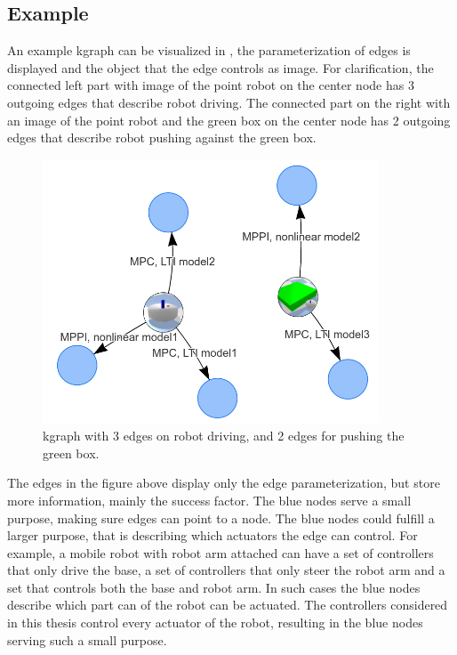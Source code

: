 \subsection{Example}%
\label{subsec:kgraph_example}
An example \ac{kgraph} can be visualized in , the parameterization of edges is displayed and the object that the edge controls as image. For clarification, the connected left part with image of the point robot on the center node has 3 outgoing edges that describe robot driving. The connected part on the right with an image of the point robot and the green box on the center node has 2 outgoing edges that describe robot pushing against the green box.\bs

\begin{figure}[H]
    \centering
    \includegraphics[width=10cm]{figures/kgraph_example}
    \caption{\ac{kgraph} with 3 edges on robot driving, and 2 edges for pushing the green box.}%
    \label{fig:kgraph_example}
\end{figure}

The edges in the figure above display only the edge parameterization, but store more information, mainly the success factor. The blue nodes serve a small purpose, making sure edges can point to a node. The blue nodes could fulfill a larger purpose, that is describing which actuators the edge can control. For example, a mobile robot with robot arm attached can have a set of controllers that only drive the base, a set of controllers that only steer the robot arm and a set that controls both the base and robot arm. In such cases the blue nodes describe which part can of the robot can be actuated. The controllers considered in this thesis control every actuator of the robot, resulting in the blue nodes serving such a small purpose.\bs
